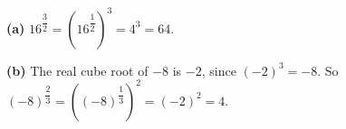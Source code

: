 \textbf{(a)} $16^{\dfrac32}=\left(16^{\dfrac12}\right)^3=4^3=\boxed{64}$.

\textbf{(b)} The real cube root of $-8$ is $-2$, since $(-2)^3=-8$. So $(-8)^{\dfrac23}=\left((-8)^{\dfrac13}\right)^2=(-2)^2=\boxed{4}$.

